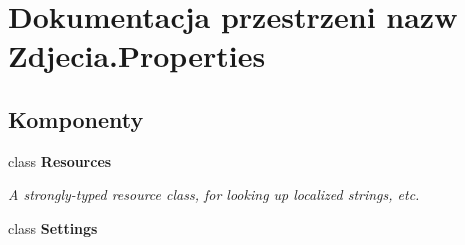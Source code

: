 \hypertarget{namespace_zdjecia_1_1_properties}{}\section{Dokumentacja przestrzeni nazw Zdjecia.\+Properties}
\label{namespace_zdjecia_1_1_properties}
\subsection*{Komponenty}
\begin{DoxyCompactItemize}
\item 
class {\bfseries Resources}
\begin{DoxyCompactList}\small\item\em A strongly-\/typed resource class, for looking up localized strings, etc. \end{DoxyCompactList}\item 
class {\bfseries Settings}
\end{DoxyCompactItemize}
